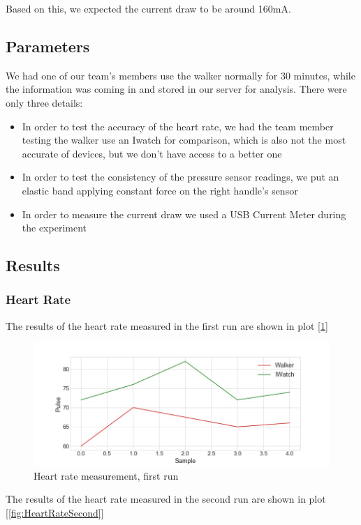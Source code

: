 			Based on this, we expected the current draw to be around 160mA.

	\subsection*{Parameters}
		We had one of our team's members use the walker normally for 30 minutes, while the information was coming in and stored in our server for analysis. There were only three details:

		\begin{itemize}
		  \item In order to test the accuracy of the heart rate, we had the team member testing the walker use an Iwatch for comparison, which is also not the most accurate of devices, but we don't have access to a better one
		  \item In order to test the consistency of the pressure sensor readings, we put an elastic band applying constant force on the right handle's sensor
		  \item In order to measure the current draw we used a USB Current Meter during the experiment
		\end{itemize}

	\subsection*{Results}
		
		\subsubsection{Heart Rate}
			The results of the heart rate measured in the first run are shown in plot [\ref{fig:HeartRateFirst}]

			\begin{figure}[h!]
				\centering
				\includegraphics[width=1.1\linewidth]{gfx/pulse_run1_diff.jpg}
				\caption{Heart rate measurement, first run}
				\label{fig:HeartRateFirst}
			\end{figure}
			\newpage
			The results of the heart rate measured in the second run are shown in plot [\ref{fig:HeartRateSecond}]

